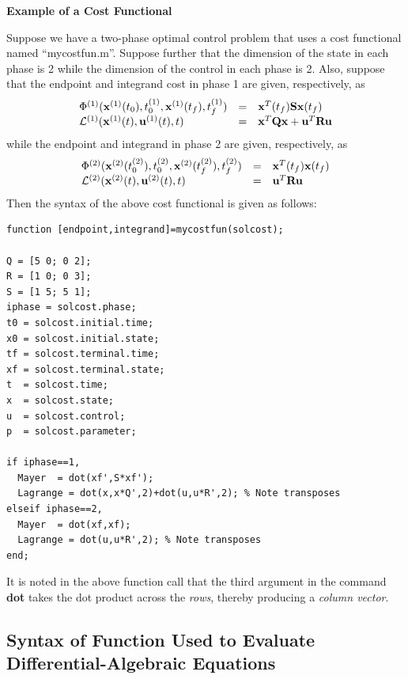 \documentclass[10pt,final]{report}
\newenvironment{shadedframe}{%
  \def\FrameCommand{\fcolorbox{black}{shadecolor}}%
  \MakeFramed {\FrameRestore}}
{\endMakeFramed}
\begin{document}
\begin{shadedframe}
{\noindent}{\bf Example of a Cost Functional}
\vspace{12pt}

Suppose we have a two-phase optimal control problem that uses a cost
functional named ``mycostfun.m''.  Suppose further that the dimension of the
state in each phase is 2 while the dimension of the control in each phase is
2.  Also, suppose that the endpoint and integrand cost in phase 1 are
given, respectively, as
\begin{displaymath}
  \begin{array}{lcl}
    \Phi^{(1)}(\mathbf{x}^{(1)}(t_0),t_0^{(1)},\mathbf{x}^{(1)}(t_f),t_f^{(1)}) & = & \mathbf{x}^T(t_f)\mathbf{S}\mathbf{x}(t_f) \\
    \mathcal{L}^{(1)}(\mathbf{x}^{(1)}(t),\mathbf{u}^{(1)}(t),t) & = & \mathbf{x}^T\mathbf{Q}\mathbf{x} + \mathbf{u}^T\mathbf{R}\mathbf{u}
  \end{array}
\end{displaymath}
while the endpoint and integrand in phase 2 are given, respectively, as
\begin{displaymath}
  \begin{array}{lcl}
    \Phi^{(2)}(\mathbf{x}^{(2)}(t_0^{(2)}),t_0^{(2)},\mathbf{x}^{(2)}(t_f^{(2)}),t_f^{(2)}) & = & \mathbf{x}^T(t_f)\mathbf{x}(t_f) \\
    \mathcal{L}^{(2)}(\mathbf{x}^{(2)}(t),\mathbf{u}^{(2)}(t),t) & = & \mathbf{u}^T\mathbf{R}\mathbf{u}
  \end{array}
\end{displaymath}
Then the syntax of the above cost functional is given as follows:
\begin{verbatim}
function [endpoint,integrand]=mycostfun(solcost);

Q = [5 0; 0 2];
R = [1 0; 0 3];
S = [1 5; 5 1];
iphase = solcost.phase;
t0 = solcost.initial.time;
x0 = solcost.initial.state;
tf = solcost.terminal.time;
xf = solcost.terminal.state;
t  = solcost.time;
x  = solcost.state;
u  = solcost.control;
p  = solcost.parameter;

if iphase==1,
  Mayer  = dot(xf',S*xf');
  Lagrange = dot(x,x*Q',2)+dot(u,u*R',2); % Note transposes
elseif iphase==2,
  Mayer  = dot(xf,xf);
  Lagrange = dot(u,u*R',2); % Note transposes
end;
\end{verbatim}
It is noted in the above function call that the third argument in the
command {\bf dot} takes the dot product across the {\em rows}, thereby
producing a {\em column vector}.
\end{shadedframe}

\subsection{Syntax of Function Used to Evaluate Differential-Algebraic Equations\label{sect:_Dae_syntax}}
\end{document}

